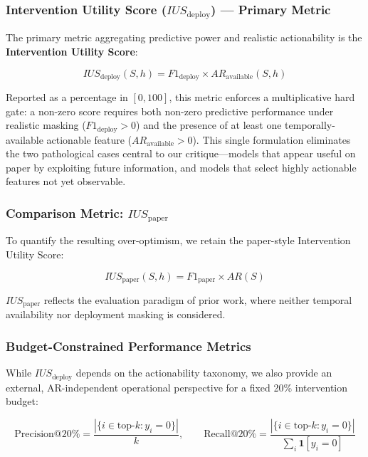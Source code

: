 \documentclass[a4paper,fleqn]{cas-sc}
\begin{document}
\subsubsection{Intervention Utility Score ($IUS_{\text{deploy}}$) --- Primary Metric}
The primary metric aggregating predictive power and realistic actionability is the \textbf{Intervention Utility Score}:

\begin{equation}
    IUS_{\text{deploy}}(S, h) = F1_{\text{deploy}} \times AR_{\text{available}}(S, h)
\end{equation}

Reported as a percentage in $[0, 100]$, this metric enforces a multiplicative hard gate: a non-zero score requires both non-zero predictive performance under realistic masking ($F1_{\text{deploy}} > 0$) and the presence of at least one temporally-available actionable feature ($AR_{\text{available}} > 0$). This single formulation eliminates the two pathological cases central to our critique---models that appear useful on paper by exploiting future information, and models that select highly actionable features not yet observable.

\subsubsection{Comparison Metric: $IUS_{\text{paper}}$}
To quantify the resulting over-optimism, we retain the paper-style Intervention Utility Score:

\begin{equation}
    IUS_{\text{paper}}(S, h) = F1_{\text{paper}} \times AR(S)
\end{equation}

$IUS_{\text{paper}}$ reflects the evaluation paradigm of prior work, where neither temporal availability nor deployment masking is considered.

\subsubsection{Budget-Constrained Performance Metrics}
While $IUS_{\text{deploy}}$ depends on the actionability taxonomy, we also provide an external, AR-independent operational perspective for a fixed 20\% intervention budget:

\begin{equation}
    \text{Precision@20\%} = \frac{|\{i \in \text{top-}k : y_i = 0\}|}{k}, \qquad
    \text{Recall@20\%} = \frac{|\{i \in \text{top-}k : y_i = 0\}|}{\sum_i \mathbf{1}[y_i = 0]}
\end{equation}
\end{document}
